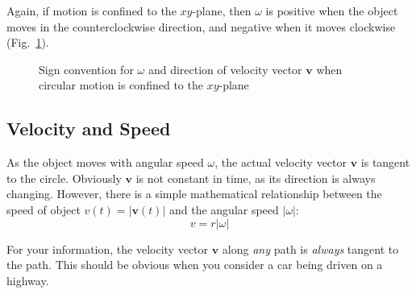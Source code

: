 Again, if motion is confined to the $xy$-plane, then $\omega$ is positive when
the object moves in the counterclockwise direction, and negative when it moves
clockwise (Fig.~\ref{fig:omega-plus-minus}).
\begin{figure}[ht]
  \centering
  \caption{Sign convention for $\omega$ and direction of velocity vector
    $\bm v$ when circular motion is confined to the $xy$-plane}
  \label{fig:omega-plus-minus}
\end{figure}



\subsection{Velocity and Speed}
As the object moves with angular speed $\omega$, the actual velocity vector
$\bm v$ is tangent to the circle. Obviously
$\bm v$ is not constant in time, as its direction is always changing.
However, there is a simple mathematical relationship between the speed of object
$v(t)=|\bm v(t)|$ and the angular speed $|\omega|$:
\begin{equation}
  \boxed{
    v=r|\omega|
  }
\end{equation}
\begin{remark}
  For your information, the velocity vector $\bm v$ along \emph{any} path
  is \emph{always} tangent to the path. This should be obvious when you
  consider a car being driven on a highway.
\end{remark}

  
